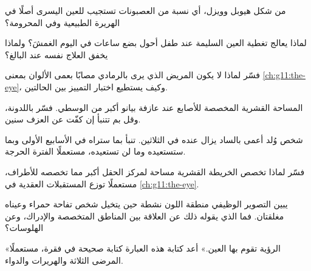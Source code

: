 \begin{exercise}[$\star\star$]\label{exo:g11:vision-and-brain:8}
من شكل هيوبل وويزل، أي نسبة من العصبونات تستجيب للعين اليسرى أصلًا في
الهريرة الطبيعية وفي المحرومة؟
\end{exercise}

\begin{exercise}[$\star\star$]\label{exo:g11:vision-and-brain:9}
لماذا يعالج تغطية العين السليمة عند طفل أحول بضع ساعات في اليوم الغمشَ؟
ولماذا يخفق العلاج نفسه عند البالغ؟
\end{exercise}

\begin{exercise}[$\star\star$]\label{exo:g11:vision-and-brain:10}
فسّر لماذا لا يكون المريض الذي يرى بالرمادي مصابًا بعمى الألوان بمعنى
\cref{ch:g11:the-eye}، وكيف يستطيع اختبار التمييز بين الحالتين.
\end{exercise}

\begin{exercise}[$\star\star$]\label{exo:g11:vision-and-brain:11}
المساحة القشرية المخصصة للأصابع عند عازفة بيانو أكبر من الوسطي. فسّر
باللدونة، وقل بم تتنبأ إن كفّت عن العزف سنين.
\end{exercise}

\begin{exercise}[$\star\star\star$]\label{exo:g11:vision-and-brain:12}
شخص وُلد أعمى بالساد يزال عنده في الثلاثين. تنبأ بما ستراه في الأسابيع
الأولى وبما ستستعيده وما لن تستعيده، مستعملًا الفترة الحرجة.
\end{exercise}

\begin{exercise}[$\star\star\star$]\label{exo:g11:vision-and-brain:13}
فسّر لماذا تخصص الخريطة القشرية مساحة لمركز الحقل أكبر مما تخصصه
للأطراف، مستعملًا توزع المستقبلات  العقدية في
\cref{ch:g11:the-eye}.
\end{exercise}

\begin{exercise}[$\star\star\star$]\label{exo:g11:vision-and-brain:14}
يبين التصوير الوظيفي منطقة اللون نشطة حين يتخيل شخص تفاحة حمراء وعيناه
مغلقتان. فما الذي يقوله ذلك عن العلاقة بين المناطق المتخصصة والإدراك،
وعن الهلوسات؟
\end{exercise}

\begin{exercise}[$\star\star\star$]\label{exo:g11:vision-and-brain:15}
«الرؤية تقوم بها العين.» أعد كتابة هذه العبارة كتابة صحيحة في فقرة،
مستعملًا المرضى الثلاثة والهريرات والدواء.
\end{exercise}


